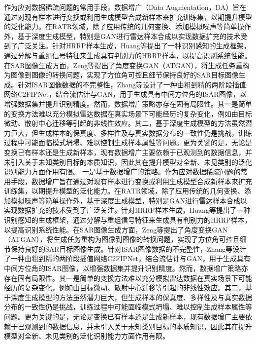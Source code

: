 作为应对数据稀疏问题的常用手段，数据增广（Data Augmentation，DA）旨在通过对现有样本进行变换或利用生成模型合成新样本来扩充训练集，以期提升模型的泛化能力。在RATR领域，除了应用传统的几何变换、添加模拟噪声等简单操作外，基于深度生成模型，特别是GAN进行雷达样本合成以实现数据扩充的技术受到了广泛关注。针对HRRP样本生成，Huang等提出了一种识别感知的生成框架，通过分解与重组信号特征来生成具有判别力的HRRP样本，以提高识别系统性能。在SAR图像生成方面，Zeng等提出了角度变换GAN（ATGAN），将生成任务重构为图像到图像的转换问题，实现了方位角可控且细节保持良好的SAR目标图像生成。针对ISAR图像数据的不完整性，Zhang等设计了一种由粗到精的两阶段插值网络C2FIPNet，结合流估计与GAN，用于生成具有中间方位角的ISAR图像，以增强数据集并提升识别精度。然而，数据增广策略亦存在固有局限性。其一是简单的变换方法难以充分模拟雷达数据在真实场景下可能经历的复杂变化，例如由目标微动、散射中心迁移等引起的非线性效应。其二，基于深度生成模型的方法虽然潜力巨大，但生成样本的保真度、多样性及与真实数据分布的一致性仍是挑战，训练过程中可能面临模式坍塌、难以控制生成样本属性等问题。更为关键的是，无论是变换已有样本还是生成新样本，现有数据增广主要依赖于已观测到的数据信息，并未引入关于未知类别目标的本质知识，因此其在提升模型对全新、未见类别的泛化识别能力方面作用有限。
一是基于数据增广的策略。作为应对数据稀疏问题的常用手段，数据增广旨在通过对现有样本进行变换或利用生成模型合成新样本来扩充训练集，以期提升模型的泛化能力。在RATR领域，除了应用传统的几何变换、添加模拟噪声等简单操作外，基于深度生成模型，特别是GAN进行雷达样本合成以实现数据扩充的技术受到了广泛关注。针对HRRP样本生成，Huang等提出了一种识别感知的生成框架，通过分解与重组信号特征来生成具有判别力的HRRP样本，以提高识别系统性能。在SAR图像生成方面，Zeng等提出了角度变换GAN（ATGAN），将生成任务重构为图像到图像的转换问题，实现了方位角可控且细节保持良好的SAR目标图像生成。针对ISAR图像数据的不完整性，Zhang等设计了一种由粗到精的两阶段插值网络C2FIPNet，结合流估计与GAN，用于生成具有中间方位角的ISAR图像，以增强数据集并提升识别精度。然而，数据增广策略亦存在固有局限性。其一是简单的变换方法难以充分模拟雷达数据在真实场景下可能经历的复杂变化，例如由目标微动、散射中心迁移等引起的非线性效应。其二，基于深度生成模型的方法虽然潜力巨大，但生成样本的保真度、多样性及与真实数据分布的一致性仍是挑战，训练过程中可能面临模式坍塌、难以控制生成样本属性等问题。更为关键的是，无论是变换已有样本还是生成新样本，现有数据增广主要依赖于已观测到的数据信息，并未引入关于未知类别目标的本质知识，因此其在提升模型对全新、未见类别的泛化识别能力方面作用有限。

